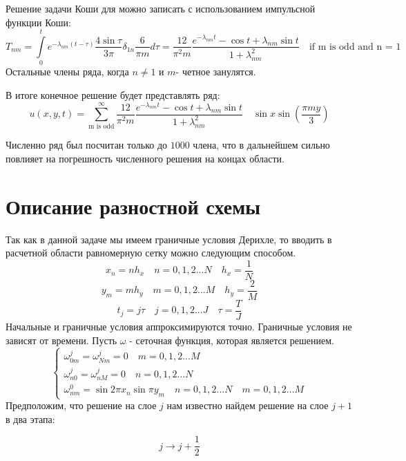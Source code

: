 \documentclass{article}
\begin{document}
Решение задачи Коши для можно записать с использованием импульсной функции Коши:
$$
T_{nm} = \int\limits_{0}^{t} e^{-\lambda_{nm}(t-\tau)} \frac{4\sin \tau}{3\pi}\delta_{1n}\frac{6}{\pi m}d\tau =\frac{12}{\pi^2 m} \frac{ e^{-\lambda_{nm}t} - \cos t + \lambda_{nm}\sin t}{1 + \lambda_{nm}^2}\quad \text{if m is odd and n = 1}
$$
Остальные члены ряда, когда $n\neq 1$ и $m$- четное занулятся.


В итоге конечное решение будет представлять ряд:
$$
u(x,y,t) =  \sum\limits_{\text{m is odd}}^{\infty} \frac{12}{\pi^2 m} \frac{ e^{-\lambda_{nm}t} - \cos t + \lambda_{nm}\sin t}{1 + \lambda_{nm}^2}\quad \sin x \sin \left(\frac{\pi m y }{3}\right)
$$

Численно ряд был посчитан только до $1000$ члена, что в дальнейшем сильно повлияет на погрешность численного решения на концах области.





\section{Описание разностной схемы}
Так как в данной задаче мы имеем граничные условия Дерихле, то вводить в расчетной области равномерную сетку можно следующим способом.
$$
x_n = n h_x\quad n=0,1,2...N\quad h_x = \frac{1}{N}
$$
$$
y_m = m h_y\quad m=0,1,2...M\quad h_y = \frac{2}{M}
$$
$$
t_j = j \tau\quad j=0,1,2...J\quad \tau = \frac{T}{J}
$$
Начальные и граничные условия аппроксимируются точно. Граничные условия не зависят от времени. Пусть $\omega$ - сеточная функция, которая является решением.
\begin{equation}
    \begin{cases}
        \omega^{j}_{0m} = \omega^{j}_{Nm} = 0 \quad m=0,1,2...M\\
        \omega^{j}_{n0} = \omega^{j}_{nM} = 0 \quad 
        n=0,1,2...N\\
        \omega^0_{nm} = \sin 2\pi x_n \sin \pi y_m\quad n=0,1,2...N\quad m=0,1,2...M
    \end{cases}
\end{equation}
Предположим, что решение на слое $j$ нам известно найдем решение на слое $j+1$ в два этапа:



$$ j \rightarrow j+\frac{1}{2}$$
\end{document}
